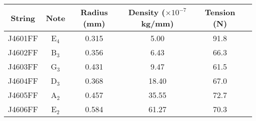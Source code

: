 \begin{tabular}{cccccc}
\toprule
String & Note & Radius (mm) & Density ($\times 10^{-7}$ kg/mm) & Tension (N) \\
\midrule
J4601FF & E$_{4}$ & 0.315 & 5.00 & 91.8 \\
J4602FF & B$_{3}$ & 0.356 & 6.43 & 66.3 \\
J4603FF & G$_{3}$ & 0.431 & 9.47 & 61.5 \\
J4604FF & D$_{3}$ & 0.368 & 18.40 & 67.0 \\
J4605FF & A$_{2}$ & 0.457 & 35.55 & 72.7 \\
J4606FF & E$_{2}$ & 0.584 & 61.27 & 70.3 \\
\bottomrule
\end{tabular}

